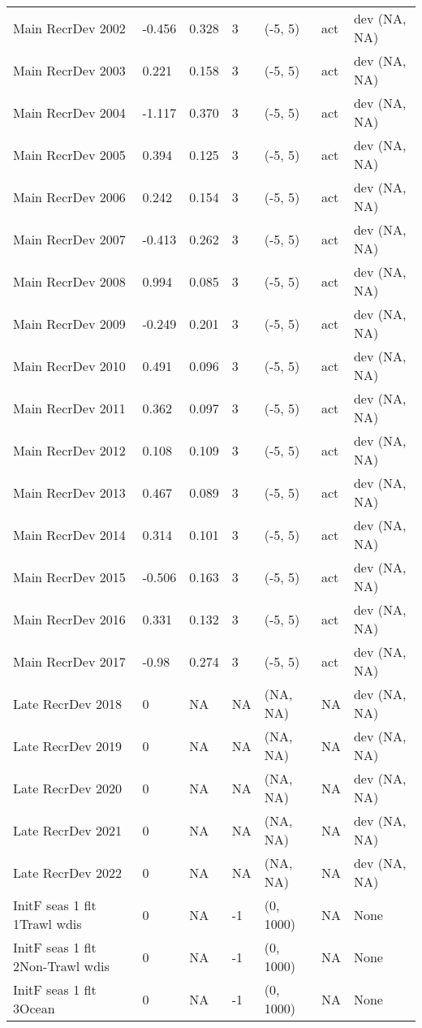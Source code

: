 \documentclass[11pt,
  letterpaper,
]{article}
\begin{document}
\begin{landscape}
\begin{longtable}[t]{>{\raggedright\arraybackslash}p{7.5cm}lllll>{\raggedright\arraybackslash}p{3.5cm}}
Main RecrDev 2002 & -0.456 & 0.328 & 3 & (-5, 5) & act & dev (NA, NA)\\
Main RecrDev 2003 & 0.221 & 0.158 & 3 & (-5, 5) & act & dev (NA, NA)\\
Main RecrDev 2004 & -1.117 & 0.370 & 3 & (-5, 5) & act & dev (NA, NA)\\
Main RecrDev 2005 & 0.394 & 0.125 & 3 & (-5, 5) & act & dev (NA, NA)\\
Main RecrDev 2006 & 0.242 & 0.154 & 3 & (-5, 5) & act & dev (NA, NA)\\
Main RecrDev 2007 & -0.413 & 0.262 & 3 & (-5, 5) & act & dev (NA, NA)\\
Main RecrDev 2008 & 0.994 & 0.085 & 3 & (-5, 5) & act & dev (NA, NA)\\
Main RecrDev 2009 & -0.249 & 0.201 & 3 & (-5, 5) & act & dev (NA, NA)\\
Main RecrDev 2010 & 0.491 & 0.096 & 3 & (-5, 5) & act & dev (NA, NA)\\
Main RecrDev 2011 & 0.362 & 0.097 & 3 & (-5, 5) & act & dev (NA, NA)\\
Main RecrDev 2012 & 0.108 & 0.109 & 3 & (-5, 5) & act & dev (NA, NA)\\
Main RecrDev 2013 & 0.467 & 0.089 & 3 & (-5, 5) & act & dev (NA, NA)\\
Main RecrDev 2014 & 0.314 & 0.101 & 3 & (-5, 5) & act & dev (NA, NA)\\
Main RecrDev 2015 & -0.506 & 0.163 & 3 & (-5, 5) & act & dev (NA, NA)\\
Main RecrDev 2016 & 0.331 & 0.132 & 3 & (-5, 5) & act & dev (NA, NA)\\
Main RecrDev 2017 & -0.98 & 0.274 & 3 & (-5, 5) & act & dev (NA, NA)\\
Late RecrDev 2018 & 0 & NA & NA & (NA, NA) & NA & dev (NA, NA)\\
Late RecrDev 2019 & 0 & NA & NA & (NA, NA) & NA & dev (NA, NA)\\
Late RecrDev 2020 & 0 & NA & NA & (NA, NA) & NA & dev (NA, NA)\\
Late RecrDev 2021 & 0 & NA & NA & (NA, NA) & NA & dev (NA, NA)\\
Late RecrDev 2022 & 0 & NA & NA & (NA, NA) & NA & dev (NA, NA)\\
InitF seas 1 flt 1Trawl wdis & 0 & NA & -1 & (0, 1000) & NA & None\\
InitF seas 1 flt 2Non-Trawl wdis & 0 & NA & -1 & (0, 1000) & NA & None\\
InitF seas 1 flt 3Ocean & 0 & NA & -1 & (0, 1000) & NA & None\\

\end{longtable}
\end{landscape}
\end{document}
